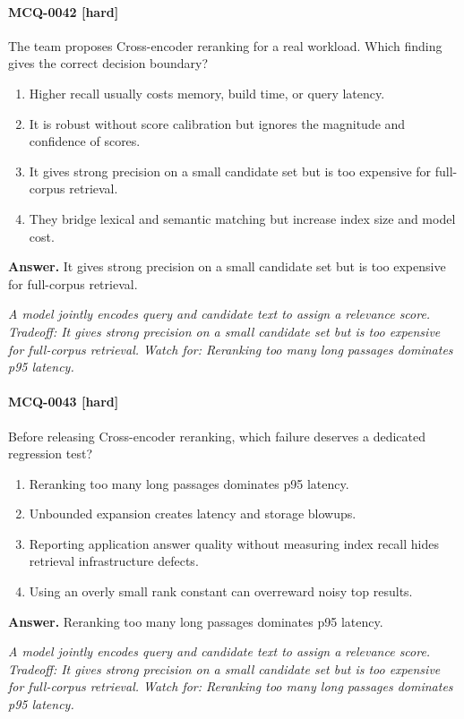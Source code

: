 \paragraph{MCQ-0042 [hard]} The team proposes Cross-encoder reranking for a real workload. Which finding gives the correct decision boundary?
\begin{enumerate}[label=\Alph*.]
\item Higher recall usually costs memory, build time, or query latency.
\item It is robust without score calibration but ignores the magnitude and confidence of scores.
\item It gives strong precision on a small candidate set but is too expensive for full-corpus retrieval.
\item They bridge lexical and semantic matching but increase index size and model cost.
\end{enumerate}
\noindent\textbf{Answer.} It gives strong precision on a small candidate set but is too expensive for full-corpus retrieval.
\par\textit{A model jointly encodes query and candidate text to assign a relevance score. Tradeoff: It gives strong precision on a small candidate set but is too expensive for full-corpus retrieval. Watch for: Reranking too many long passages dominates p95 latency.}
\paragraph{MCQ-0043 [hard]} Before releasing Cross-encoder reranking, which failure deserves a dedicated regression test?
\begin{enumerate}[label=\Alph*.]
\item Reranking too many long passages dominates p95 latency.
\item Unbounded expansion creates latency and storage blowups.
\item Reporting application answer quality without measuring index recall hides retrieval infrastructure defects.
\item Using an overly small rank constant can overreward noisy top results.
\end{enumerate}
\noindent\textbf{Answer.} Reranking too many long passages dominates p95 latency.
\par\textit{A model jointly encodes query and candidate text to assign a relevance score. Tradeoff: It gives strong precision on a small candidate set but is too expensive for full-corpus retrieval. Watch for: Reranking too many long passages dominates p95 latency.}
